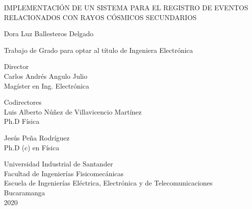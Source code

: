 
\begin{center}

IMPLEMENTACI\'ON DE UN SISTEMA PARA EL REGISTRO DE EVENTOS RELACIONADOS CON RAYOS C\'OSMICOS SECUNDARIOS\vfill%

Dora Luz Ballesteros Delgado%

Trabajo de Grado para optar al t\'itulo de Ingeniera Electr\'onica\vfill %

Director\\
Carlos Andr\'es Angulo Julio\\
Magíster en Ing. Electr\'onica\bigskip

Codirectores\\
Luis Alberto Núñez de Villavicencio Martínez \\
Ph.D  Física \bigskip

Jesús Peña Rodríguez\\
Ph.D (c) en F\'isica
\vfill

Universidad Industrial de Santander\\
Facultad de Ingenier\'ias Fisicomec\'anicas\\
Escuela de Ingenier\'ias El\'ectrica, Electr\'onica y de Telecomunicaciones\\
Bucaramanga\\
2020
\end{center}




